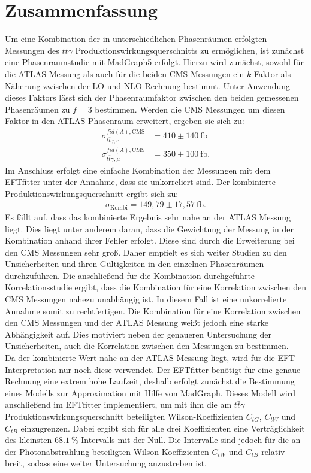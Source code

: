 \chapter{Zusammenfassung}
Um eine Kombination der in unterschiedlichen Phasenräumen erfolgten Messungen des $t\bar{t}\gamma$ Produktionswirkungsquerschnitts zu ermöglichen, ist zunächst eine Phasenraumstudie mit MadGraph5 erfolgt. Hierzu wird zunächst, sowohl für die ATLAS Messung als auch für die beiden CMS-Messungen ein $k$-Faktor als Näherung zwischen der LO und NLO Rechnung bestimmt. Unter Anwendung dieses Faktors lässt sich der Phasenraumfaktor zwischen den beiden gemessenen Phasenräumen zu $f=3$ bestimmen. Werden die CMS Messungen um diesen Faktor in den ATLAS Phasenraum erweitert, ergeben sie sich zu:
\begin{align*}
  \sigma^{fid(A), \text{CMS}}_{t\bar{t}\gamma, e} &= 410 \pm 140~ \si{\femto\barn}\\
  \sigma^{fid(A), \text{CMS}}_{t\bar{t}\gamma, \mu} &= 350 \pm 100~ \si{\femto\barn}.
\end{align*}
Im Anschluss erfolgt eine einfache Kombination der Messungen mit dem EFTfitter unter der Annahme, dass sie unkorreliert sind. Der kombinierte Produktionswirkungsquerschnitt ergibt sich zu:
\begin{align*}
  \sigma_{\text{Kombi}} = 149,79 \pm 17,57~ \si{\femto\barn}.
\end{align*}
Es fällt auf, dass das kombinierte Ergebnis sehr nahe an der ATLAS Messung liegt. Dies liegt unter anderem daran, dass die Gewichtung der Messung in der Kombination anhand ihrer Fehler erfolgt. Diese sind durch die Erweiterung bei den CMS Messungen sehr groß. Daher empfielt es sich weiter Studien zu den Unsicherheiten und ihren Gültigkeiten in den einzelnen Phasenräumen durchzuführen. Die anschließend für die Kombination durchgeführte Korrelationsstudie ergibt, dass die Kombination für eine Korrelation zwischen den CMS Messungen nahezu unabhängig ist. In diesem Fall ist eine unkorrelierte Annahme somit zu rechtfertigen. Die Kombination für eine Korrelation zwischen den CMS Messungen und der ATLAS Messung weißt jedoch eine starke Abhängigkeit auf. Dies motiviert neben der genaueren Untersuchung der Unsicherheiten, auch die Korrelation zwischen den Messungen zu bestimmen.\\
Da der kombinierte Wert nahe an der ATLAS Messung liegt, wird für die EFT-Interpretation nur noch diese verwendet. Der EFTfitter benötigt für eine genaue Rechnung eine extrem hohe Laufzeit, deshalb erfolgt zunächst die Bestimmung eines Modells zur Approximation mit Hilfe von MadGraph. Dieses Modell wird anschließend im EFTfitter implementiert, um mit ihm die am $t\bar{t}\gamma$ Produktionswirkungsquerschnitt beteiligten Wilson-Koeffizienten $C_{tG}$, $C_{tW}$ und $C_{tB}$ einzugrenzen. Dabei ergibt sich für alle drei Koeffizienten eine Verträglichkeit des kleinsten $\SI{68.1}{\percent}$ Intervalls mit der Null. Die Intervalle sind jedoch für die an der Photonabstrahlung beteiligten Wilson-Koeffizienten $C_{tW}$ und $C_{tB}$ relativ breit, sodass eine weiter Untersuchung anzustreben ist.
